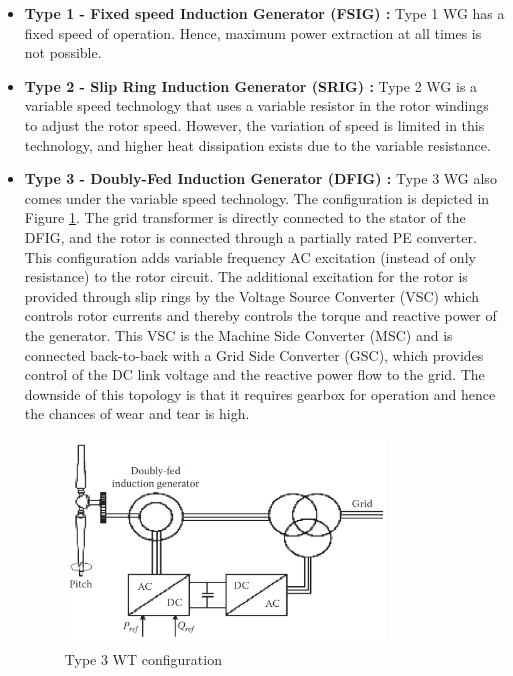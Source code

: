 \begin{itemize}
    \item \textbf{Type 1 - Fixed speed Induction Generator (FSIG) :} Type 1 \gls{WG} has a fixed speed of operation. Hence, maximum power extraction at all times is not possible.
    \item \textbf{Type 2 - Slip Ring Induction Generator (SRIG) :} Type 2 \gls{WG} is a variable speed technology that uses a variable resistor in the rotor windings to adjust the rotor speed. However, the variation of speed is limited in this technology, and higher heat dissipation exists due to the variable resistance.
    \item \textbf{Type 3 - Doubly-Fed Induction Generator (DFIG) :} Type 3 \gls{WG} also comes under the variable speed technology. The configuration is depicted in Figure \ref{fig:Type3}. The grid transformer is directly connected to the stator of the DFIG, and the rotor is connected through a partially rated \gls{PE} converter. This configuration adds variable frequency \gls{AC} excitation (instead of only resistance) to the rotor circuit. The additional excitation for the rotor is provided through slip rings by the Voltage Source Converter (\gls{VSC}) which controls rotor currents and thereby controls the torque and reactive power of the generator. This \gls{VSC} is the Machine Side Converter (\gls{MSC}) and is connected back-to-back with a Grid Side Converter (\gls{GSC}), which provides control of the \gls{DC} link voltage and the reactive power flow to the grid. The downside of this topology is that it requires gearbox for operation and hence the chances of wear and tear is high.
    
    \begin{figure}[H]
\centering
    \includegraphics[height = 5.5cm,width = 8.5cm]{Diagrams/Chapter_2/Type3WT_1.PNG}
    \caption{Type 3 WT configuration \cite{ali_wind_2012}}
    \label{fig:Type3}
\end{figure}
    

\end{itemize}

